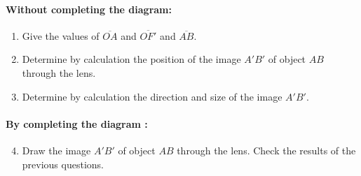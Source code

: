 \documentclass[tikz-cross]{HSP-Lecture}
\begin{document}
	\paragraph{Without completing the diagram:}
	\begin{enumerate}
		\item Give the values of $\overline{OA}$ and $\overline{OF'}$ and $\overline{AB}$.
		\item Determine by calculation the position of the image $A'B'$ of object $AB$ through the lens.
		\item Determine by calculation the direction and size of the image $A'B'$.
	\end{enumerate}
	
	\paragraph{By completing the diagram :}
	\begin{enumerate}
		\setcounter{enumi}{3}
		\item Draw the image $A'B'$ of object $AB$ through the lens. Check the results of the previous questions.
	\end{enumerate}
\end{document}
